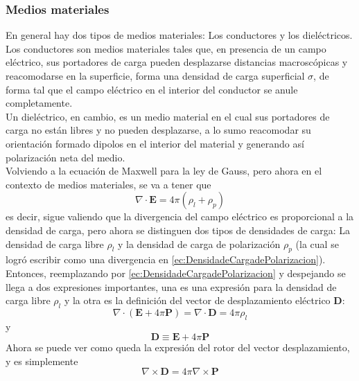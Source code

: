 \subsubsection{Medios materiales}
En general hay dos tipos de medios materiales: Los conductores y los dieléctricos.\\ 
\indent Los conductores son medios materiales tales que, en presencia de un campo eléctrico, sus portadores de carga pueden desplazarse distancias macroscópicas y reacomodarse en la superficie, forma una densidad de carga superficial $\sigma$, de forma tal que el campo eléctrico en el interior del conductor se anule completamente.\\
\indent Un dieléctrico, en cambio, es un medio material en el cual sus portadores de carga no están libres y no pueden desplazarse, a lo sumo reacomodar su orientación formado dipolos en el interior del material y generando así polarización neta del medio.\\
\indent Volviendo a la ecuación de Maxwell para la ley de Gauss, pero ahora en el contexto de medios materiales, se va a tener que
\begin{equation*}
    \nabla \cdot \textbf{E}
    = 4\pi (\rho_{l} + \rho_{p})
\end{equation*}
es decir, sigue valiendo que la divergencia del campo eléctrico es proporcional a la densidad de carga, pero ahora se distinguen dos tipos de densidades de carga: La densidad de carga libre $\rho_{l}$ y la densidad de carga de polarización $\rho_{p}$ (la cual se logró escribir como una divergencia en \eqref{ec:DensidadeCargadePolarizacion}). Entonces, reemplazando por \eqref{ec:DensidadeCargadePolarizacion} y despejando se llega a dos expresiones importantes, una es una expresión para la densidad de carga libre $\rho_{l}$ y la otra es la definición del vector de desplazamiento eléctrico $\textbf{D}$:
\begin{equation}
    \nabla \cdot (\textbf{E} + 4\pi \textbf{P}) = 
    \nabla \cdot \textbf{D}
    = 4\pi \rho_{l}
        \label{ec:DensidaddeCargaLibre}
\end{equation}
y 
\begin{equation}
    \textbf{D} \equiv \textbf{E} + 4\pi \textbf{P}
        \label{ec:VectorDeplazamientoElectrico}
\end{equation}
Ahora se puede ver como queda la expresión del rotor del vector desplazamiento, y es simplemente
\begin{equation*}
    \nabla \times \textbf{D} = 
    4\pi \nabla \times \textbf{P}
\end{equation*}

